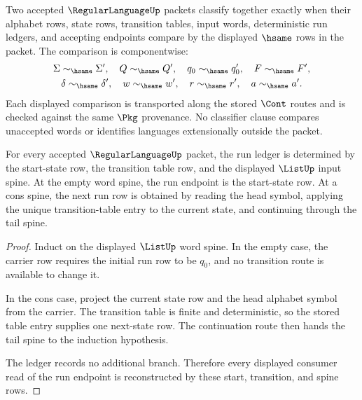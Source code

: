 \begin{definition}
\label{def:regularlanguage-classifier}
Two accepted $\RegularLanguageUp$ packets classify together exactly when their
alphabet rows, state rows, transition tables, input words, deterministic run
ledgers, and accepting endpoints compare by the displayed $\hsame$ rows in the
packet. The comparison is componentwise:
$$
\begin{gathered}
\Sigma\sim_{\hsame}\Sigma',\quad
Q\sim_{\hsame}Q',\quad
q_0\sim_{\hsame}q'_0,\quad
F\sim_{\hsame}F',\\
\delta\sim_{\hsame}\delta',\quad
w\sim_{\hsame}w',\quad
r\sim_{\hsame}r',\quad
a\sim_{\hsame}a'.
\end{gathered}
$$
Each displayed comparison is transported along the stored $\Cont$ routes and
is checked against the same $\Pkg$ provenance. No classifier clause compares
unaccepted words or identifies languages extensionally outside the packet.
\end{definition}

\begin{theorem}
\label{thm:regularlanguage-deterministic-run-ledger}
For every accepted $\RegularLanguageUp$ packet, the run ledger is determined
by the start-state row, the transition table row, and the displayed
$\ListUp$ input spine. At the empty word spine, the run endpoint is the
start-state row. At a cons spine, the next run row is obtained by reading the
head symbol, applying the unique transition-table entry to the current state,
and continuing through the tail spine.
\end{theorem}
\begin{proof}
Induct on the displayed $\ListUp$ word spine. In the empty case, the carrier
row requires the initial run row to be $q_0$, and no transition route is
available to change it.

In the cons case, project the current state row and the head alphabet symbol
from the carrier. The transition table is finite and deterministic, so the
stored table entry supplies one next-state row. The continuation route then
hands the tail spine to the induction hypothesis.

The ledger records no additional branch. Therefore every displayed consumer
read of the run endpoint is reconstructed by these start, transition, and
spine rows.
\end{proof}

